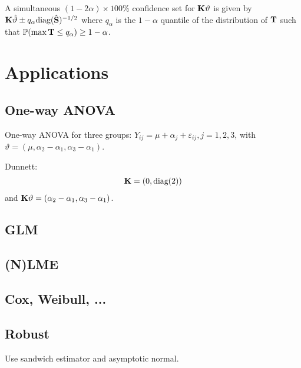 \documentclass[12pt]{article}
\begin{document}
A simultaneous $(1 - 2\alpha) \times 100\%$ 
confidence set for $\mathbf{K} \vartheta$ is given by 
$\mathbf{K} \hat{\vartheta} \pm q_\alpha \text{diag}(\hat{\mathbf{S}})^{-1/2}$
where $q_\alpha$ is the $1 - \alpha$ 
quantile of the distribution of $\mathbf{T}$ 
such that $\mathbb{P}(\max{\mathbf{T}} \le q_\alpha) \ge 1 - \alpha$.

\section{Applications}

\subsection{One-way ANOVA}

One-way ANOVA for three groups:
$Y_{ij} = \mu + \alpha_{j} + \varepsilon_{ij}, j = 1, 2, 3$,
with $\vartheta = (\mu, \alpha_2 - \alpha_1, \alpha_3 - \alpha_1)$.

Dunnett: 
\begin{eqnarray*}
\mathbf{K} = (0, \text{diag}(2))
\end{eqnarray*}
and $\mathbf{K} \vartheta = (\alpha_2 - \alpha_1, \alpha_3 - \alpha_1)$.

\subsection{GLM}

\subsection{(N)LME}

\subsection{Cox, Weibull, ...}

\subsection{Robust}

Use sandwich estimator and asymptotic normal.
\end{document}
